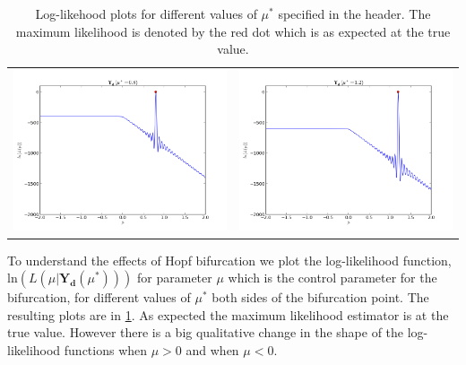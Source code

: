 \documentclass[12pt,a4paper,titlepage]{article}
\begin{document}
\begin{table}[ht]
\begin{tabular}{cc}
\includegraphics[scale=0.3]{likelihood_hopf08}&\includegraphics[scale=0.3]{likelihood_hopf12}\\
\end{tabular}
\caption{Log-likehood plots for different values of $\mu^*$ specified in the header. The maximum likelihood is denoted by the red dot which is as expected at the true value.}
\label{fig:hopf}
\end{table}
To understand the effects of Hopf bifurcation we plot the log-likelihood function, $\text{ln}(L(\mu | \mathbf{Y_{d}}(\mu^*)))$ for parameter $\mu$ which is the control parameter for the bifurcation, for different values of $\mu^*$ both sides of the bifurcation point. The resulting plots are in \ref{fig:hopf}. As expected the maximum likelihood estimator is at the true value. However there is a big qualitative change in the shape of the log-likelihood functions when $\mu > 0$ and when $\mu < 0$. 
\end{document}
